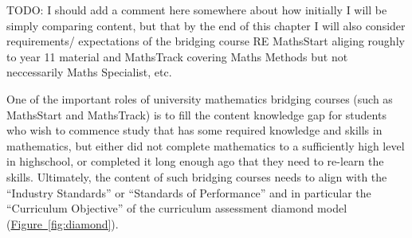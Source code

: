 \documentclass[twoside,12pt,a4paper]{report}
\newcommand{\reffig}[1]{\hyperref[fig:#1]{Figure~\ref{fig:#1}}}
\begin{document}
TODO: I should add a comment here somewhere about how initially I will be simply comparing content, but that by the end of this chapter I will also consider requirements/ expectations of the bridging course RE MathsStart aliging roughly to year 11 material and MathsTrack covering Maths Methods but not neccessarily Maths Specialist, etc.

One of the important roles of university mathematics bridging courses (such as MathsStart and MathsTrack) is to fill the content knowledge gap for students who  wish to commence study that has some required knowledge and skills in mathematics, but either did not complete mathematics to a sufficiently high level in highschool, or completed it long enough ago that they need to re-learn the skills. Ultimately, the content of such bridging courses needs to align with the ``Industry Standards'' or ``Standards of Performance'' and in particular the ``Curriculum Objective'' of the curriculum assessment diamond model (\reffig{diamond}). 
\end{document}

